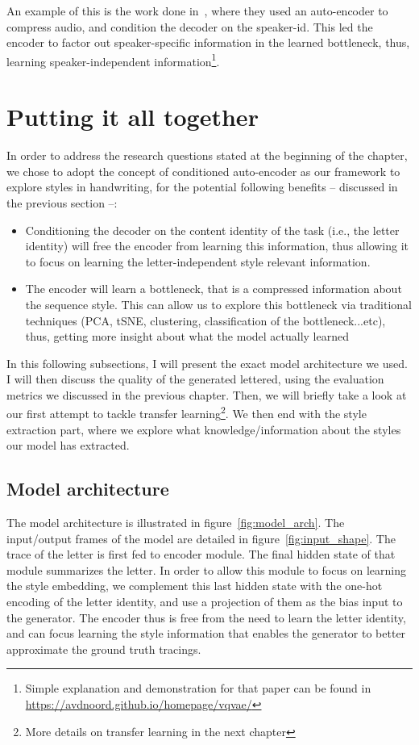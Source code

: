     \par An example of this is the work done in~\citep{van2017neural}, where they used an auto-encoder to compress audio, and condition the decoder on the speaker-id. This led the encoder to factor out speaker-specific information in the learned bottleneck, thus, learning speaker-independent information\footnote{Simple explanation and demonstration for that paper can be found in \url{https://avdnoord.github.io/homepage/vqvae/}}.

\section{Putting it all together}
  \par In order to address the research questions stated at the beginning of the chapter, we chose to adopt the concept of conditioned auto-encoder as our framework to explore styles in handwriting, for the potential following benefits -- discussed in the previous section --:
  \begin{itemize}
    \item Conditioning the decoder on the content identity of the task (i.e., the letter identity) will free the encoder from learning this information, thus allowing it to focus on learning the letter-independent style relevant information.
    \item The encoder will learn a bottleneck, that is a compressed information about the sequence style. This can allow us to explore this bottleneck via traditional techniques (PCA, tSNE, clustering, classification of the bottleneck...etc), thus, getting more insight about what the model actually learned
  \end{itemize}

  \par In this following subsections, I will present the exact model architecture we used. I will then discuss the quality of the generated lettered, using the evaluation metrics we discussed in the previous chapter. Then, we will briefly take a look at our first attempt to tackle transfer learning\footnote{More details on transfer learning in the next chapter}. We then end with the style extraction part, where we explore what knowledge/information about the styles our model has extracted.

  \subsection{Model architecture}
     \par The model architecture is illustrated in figure~\ref{fig:model_arch}. The input/output frames of the model are detailed in figure~\ref{fig:input_shape}. The trace of the letter is first fed to encoder module. The final hidden state of that module summarizes the letter. In order to allow this module to focus on learning the style embedding, we complement this last hidden state with the one-hot encoding of the letter identity, and use a projection of them as the bias input to the generator. The encoder thus is free from the need to learn the letter identity, and can focus learning the style information that enables the generator to better approximate the ground truth tracings.

